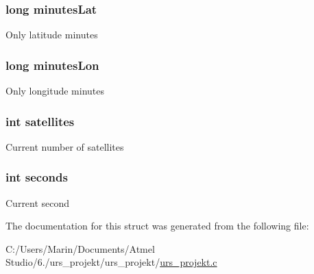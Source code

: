 \subsubsection[{minutes\+Lat}]{\setlength{\rightskip}{0pt plus 5cm}long minutes\+Lat}\label{struct_current_gps_reading_aa17df66ce835adf67ec6fbaf721b62c6}
Only latitude minutes \hypertarget{struct_current_gps_reading_a714b41fa9a0ab79d6e1188fe2b2f5bdc}{}
\subsubsection[{minutes\+Lon}]{\setlength{\rightskip}{0pt plus 5cm}long minutes\+Lon}\label{struct_current_gps_reading_a714b41fa9a0ab79d6e1188fe2b2f5bdc}
Only longitude minutes \hypertarget{struct_current_gps_reading_a691915f3fb4792e167a2351c6e932483}{}
\subsubsection[{satellites}]{\setlength{\rightskip}{0pt plus 5cm}int satellites}\label{struct_current_gps_reading_a691915f3fb4792e167a2351c6e932483}
Current number of satellites \hypertarget{struct_current_gps_reading_a77bd4f876bdc3afed5acdd936f775d34}{}
\subsubsection[{seconds}]{\setlength{\rightskip}{0pt plus 5cm}int seconds}\label{struct_current_gps_reading_a77bd4f876bdc3afed5acdd936f775d34}
Current second 

The documentation for this struct was generated from the following file\+:\begin{DoxyCompactItemize}
\item 
C\+:/\+Users/\+Marin/\+Documents/\+Atmel Studio/6./urs\+\_\+projekt/urs\+\_\+projekt/\hyperlink{urs__projekt_8c}{urs\+\_\+projekt.\+c}\end{DoxyCompactItemize}
